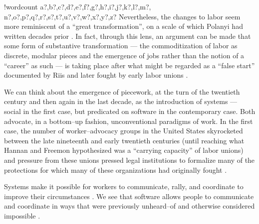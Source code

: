 \documentclass[11pt]{article}
\newcounter{words}
\newenvironment{counted}{%
  \setcounter{words}{0}
  \SearchList!{wordcount}{\stepcounter{words}}
    {a?,b?,c?,d?,e?,f?,g?,h?,i?,j?,k?,l?,m?,
    n?,o?,p?,q?,r?,s?,t?,u?,v?,w?,x?,y?,z?}
  \UndoBoundary{'}
  \SearchOrder{p;}}{%
  \StopSearching}
\begin{document}
\begin{counted}
Nevertheless, the changes to labor seem more reminiscent of a ``great transformation'', 
on a scale of which Polanyi had written decades prior
\cite{polanyi1944great}.
In fact, through this lens, an argument can be made that some form of substantive transformation
--- the commoditization of labor as discrete,
modular pieces and the emergence of jobs rather than the notion of a ``career'' as such ---
is taking place after what might be regarded as a ``false start''
documented by Riis and later fought by early labor unions
\cite{ebbinghaus1999institutions,riisOtherSideLives}.

We can think about the emergence of piecework,
at the turn of the twentieth century and then again in the last decade,
as the introduction of systems
--- social in the first case, but predicated on software in the contemporary case.
Both advocate, in a bottom--up fashion,
unconventional paradigms of work. %
In the first case,
the number of worker--advocacy groups in the United States skyrocketed between the late nineteenth and early twentieth centuries 
(until reaching what Hannan and Freemon hypothesized was a ``carrying capacity'' of labor unions)
and pressure from these unions pressed legal institutions to formalize many of the protections for which many of these organizations had originally fought
\cite{hannan1987ecology}.

Systems make it possible for workers to communicate, rally, and coordinate to improve their circumstances
\cite{turkopticon,dynamo,uberAlgorithm}.
We see that software allows people to communicate and coordinate in ways that were previously unheard--of and otherwise considered impossible
\cite{shirky2008here,miller2011understanding,costanza2014out}.


\end{counted}
\end{document}
